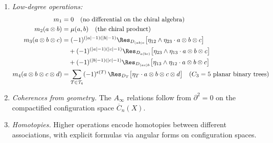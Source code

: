 \begin{theorem}
\begin{enumerate}
\item \emph{Low-degree operations:}
\begin{align}
m_1 &= 0 \quad \text{(no differential on the chiral algebra)} \\
m_2(a \otimes b) &= \mu(a,b) \quad \text{(the chiral product)} \\
m_3(a \otimes b \otimes c) &=
 (-1)^{(|a|-1)(|b|-1)}
 \Res_{D_{(ab)c}}\bigl[\eta_{12} \wedge \eta_{23}
 \cdot a \otimes b \otimes c\bigr]
 \notag \\ &\quad
 + (-1)^{(|a|-1)(|c|-1)}
 \Res_{D_{a(bc)}}\bigl[\eta_{23} \wedge \eta_{13}
 \cdot a \otimes b \otimes c\bigr]
 \notag \\ &\quad
 + (-1)^{(|b|-1)(|c|-1)}
 \Res_{D_{(ac)b}}\bigl[\eta_{13} \wedge \eta_{12}
 \cdot a \otimes b \otimes c\bigr] \\
m_4(a \otimes b \otimes c \otimes d) &= \sum_{T \in \mathcal{T}_4}
 (-1)^{\epsilon(T)}\,\Res_{D_T}
 \bigl[\eta_T \cdot a \otimes b \otimes c \otimes d\bigr]
 \quad \text{($C_3 = 5$ planar binary trees)}
\end{align}

\item \emph{Coherences from geometry.} The $A_\infty$ relations follow from $\partial^2 = 0$ on the compactified configuration space $\overline{C}_n(X)$.

\item \emph{Homotopies.} Higher operations encode homotopies between different associations, with explicit formulas via angular forms on configuration spaces.
\end{enumerate}
\end{theorem}


